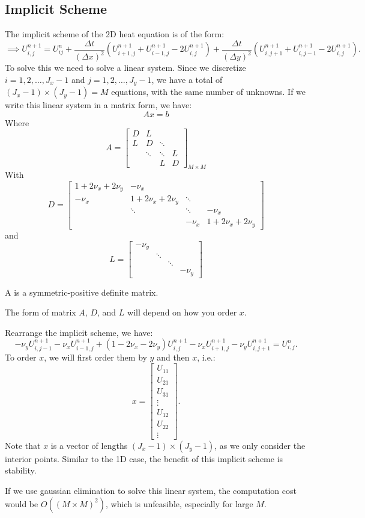 \documentclass[../main/main.tex]{subfiles}
\begin{document}
\subsection{Implicit Scheme}
The implicit scheme of the 2D heat equation is of the form: \[ 
    \implies U_{i,j}^{n+1} = U_{ij}^n + \frac{\Delta t}{(\Delta x)^2} \left( U_{i+1,j}^{n+1} + U_{i-1,j}^{n+1} - 2U_{i,j}^{n+1} \right) +\frac{\Delta t}{(\Delta y)^2} \left( U_{i,j+1}^{n+1} + U_{i,j-1}^{n+1} - 2U_{i,j}^{n+1} \right)  
.\] To solve this we need to solve a linear system. Since we discretize $i = 1,2,\ldots,J_x-1$ and $j = 1,2,\ldots,J_y-1$, we have a total of $(J_x-1)\times (J_y-1) = M$ equations, with the same number of unknowns. If we write this linear system in a matrix form, we have: \[
Ax = b
\] Where \[
A = \begin{bmatrix} D &L & & \\ L & D &\ddots & \\ &\ddots &\ddots & L \\ & & L & D \end{bmatrix}_{M \times  M}
\] With \[
D = \begin{bmatrix} 1+2\nu_x + 2\nu_y &-\nu_x & & \\ -\nu_x &  1+2\nu_x + 2\nu_y &\ddots & \\ &\ddots &\ddots & -\nu_x \\ & & -\nu_x & 1+2\nu_x + 2\nu_y \end{bmatrix}
\] and \[
L = \begin{bmatrix} -\nu_y & & & \\ & \ddots & & \\ & &\ddots &  \\ & & &-\nu_y \end{bmatrix} 
\] 
\begin{remark}
   A is a symmetric-positive definite matrix. 
\end{remark}
\begin{remark}
    The form of matrix $A$, $D$, and  $L$ will depend on how you order  $x$.
\end{remark}

Rearrange the implicit scheme, we have: \[
    -\nu_yU_{i,j-1}^{n+1} -\nu_x U_{i-1,j}^{n+1} + (1-2\nu_x -2\nu_y)U_{i,j}^{n+1} - \nu_x U_{i+1,j}^{n+1} - \nu_y U_{i,j+1}^{n+1} = U_{i,j}^{n}
.\] 
To order $x$, we will first order them by $y$ and then  $x$, i.e.:
\[
x = \begin{bmatrix} U_{11}\\ U_{21} \\ U_{31} \\ \vdots \\ U_{12}\\ U_{22} \\ \vdots \end{bmatrix} 
.\] 
Note that $x$ is a vector of lengths $(J_x-1)\times (J_y-1)$, as we only consider the interior points.  
Similar to the 1D case, the benefit of this implicit scheme is stability.

\begin{remark}
    If we use gaussian elimination to solve this linear system, the computation cost would be $O((M \times  M)^2)$, which is unfeasible, especially for large $M$. 
\end{remark}
\end{document}
